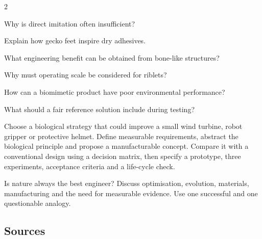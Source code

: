 \begin{multicols}{2}
\begin{questions}
\item Why is direct imitation often insufficient?
\item Explain how gecko feet inspire dry adhesives.
\item What engineering benefit can be obtained from bone-like structures?
\item Why must operating scale be considered for riblets?
\item How can a biomimetic product have poor environmental performance?
\item What should a fair reference solution include during testing?
\end{questions}

\begin{engineeringchallenge}
Choose a biological strategy that could improve a small wind turbine, robot gripper or protective
helmet. Define measurable requirements, abstract the biological principle and propose a manufacturable
concept. Compare it with a conventional design using a decision matrix, then specify a prototype,
three experiments, acceptance criteria and a life-cycle check.
\end{engineeringchallenge}

\begin{speaking}
Is nature always the best engineer? Discuss optimisation, evolution, materials, manufacturing and the
need for measurable evidence. Use one successful and one questionable analogy.
\end{speaking}
\end{multicols}

\subsection*{Sources}
